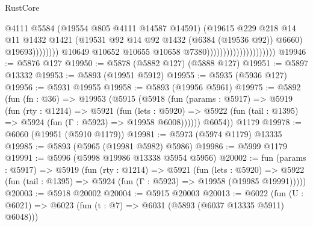 \begin{lexlean}{RustCore}
\begin{coremodule}
                                                            @4111
                                                            @5584
                                                            (@19554 @805 @4111 @14587 @14591)
                                                            (@19615
                                                              @229
                                                              @218
                                                              @14
                                                              @11
                                                              @1432
                                                              @1421
                                                              (@19531
                                                                @92
                                                                @14
                                                                @92
                                                                @1432
                                                                (@6384 (@19536 @92))
                                                                @6660)
                                                              @19693))))))))
                                              @10649
                                              @10652
                                              @10655
                                              @10658
                                              @7380)))))))))))))))))))))
@19946 := @5876 @127
@19950 := @5878 (@5882 @127) (@5888 @127)
@19951 := @5897 @13332
@19953 := @5893 (@19951 @5912)
@19955 := @5935 (@5936 @127)
@19956 := @5931 @19955
@19958 := @5893 (@19956 @5961)
@19975 := @5892
    (fun (fn : @36) =>
    @19953
      (@5915
        (@5918
          (fun (params : @5917) =>
          @5919
            (fun (rty : @1214) =>
            @5921
              (fun (lets : @5920) =>
              @5922 (fun (tail : @1395) => @5924 (fun (Γ : @5923) => @19958 @6008))))))
        @6054))
    @1179
@19978 := @6060 (@19951 (@5910 @1179))
@19981 := @5973 (@5974 @1179) @13335
@19985 := @5893 (@5965 (@19981 @5982) @5986)
@19986 := @5999 @1179
@19991 := @5996 (@5998 @19986 @13338 @5954 @5956)
@20002 := fun (params : @5917) =>
  @5919
    (fun (rty : @1214) =>
    @5921
      (fun (lets : @5920) =>
      @5922 (fun (tail : @1395) => @5924 (fun (Γ : @5923) => @19958 (@19985 @19991)))))
@20003 := @5918 @20002
@20004 := @5915 @20003
@20013 := @6022
    (fun (U : @6021) => @6023 (fun (t : @7) => @6031 (@5893 (@6037 @13335 @5911) @6048)))

\end{coremodule}
\end{lexlean}
